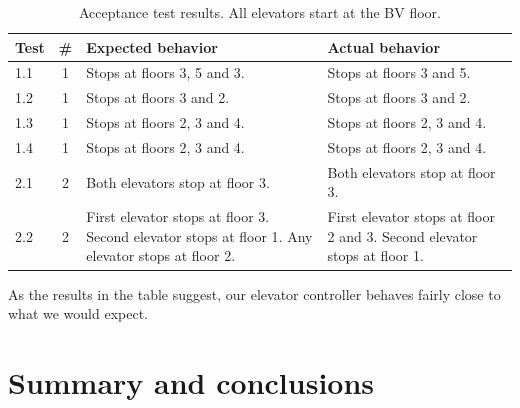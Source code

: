 \documentclass[a4paper]{article}
\begin{document}
\begin{table}[h]
    \begin{tabular}{| l | c | p{4.7cm} | p{4.7cm} |}
        \hline
        Test & \# & Expected behavior & Actual behavior \\
        \hline
        1.1 & 1 &
            Stops at floors 3, 5 and 3. &
            Stops at floors 3 and 5. \\
        1.2 & 1 &
            Stops at floors 3 and 2. &
            Stops at floors 3 and 2. \\
        1.3 & 1 &
            Stops at floors 2, 3 and 4. &
            Stops at floors 2, 3 and 4. \\
        1.4 & 1 &
            Stops at floors 2, 3 and 4. &
            Stops at floors 2, 3 and 4. \\
        2.1 & 2 &
            Both elevators stop at floor 3. &
            Both elevators stop at floor 3. \\ %
        2.2 & 2 &
            First elevator stops at floor 3.
                Second elevator stops at floor 1.
                Any elevator stops at floor 2. &
            First elevator stops at floor 2 and 3.
                Second elevator stops at floor 1. \\
        \hline
    \end{tabular}
    \caption{Acceptance test results. All elevators start at the BV floor.}
    \label{tab:acceptance_test_results}
\end{table}

As the results in the table suggest, our elevator controller behaves fairly
close to what we would expect.

\section{Summary and conclusions}
\end{document}
